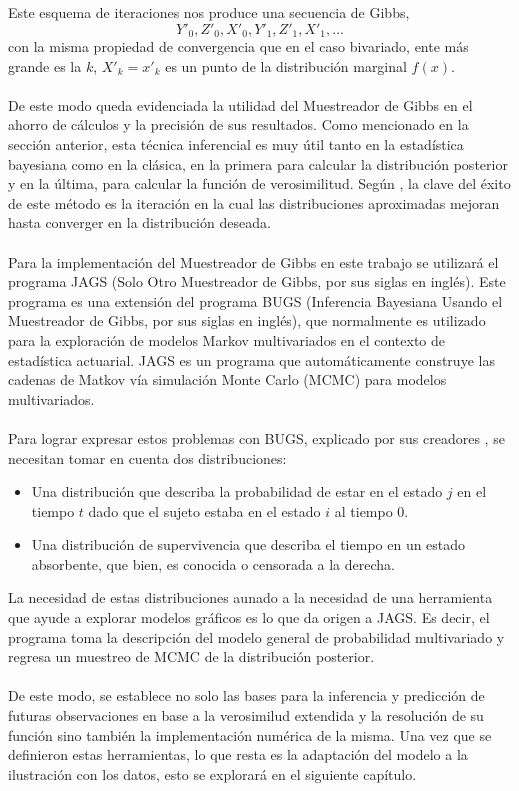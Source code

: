 Este esquema de iteraciones nos produce una secuencia de Gibbs,\\
\[Y'_0,Z'_0,X'_0,Y'_1,Z'_1,X'_1,...\]
con la misma propiedad de convergencia que en el caso bivariado, ente m\'as grande es la $k$, $X'_k=x'_k$ es un punto de la distribuci\'on marginal $f(x)$.\\
\\
De este modo queda evidenciada la utilidad del Muestreador de Gibbs en el ahorro de c\'alculos y la precisi\'on de sus resultados. Como mencionado en la secci\'on anterior, esta t\'ecnica inferencial es muy \'util tanto en la estad\'istica bayesiana como en la cl\'asica, en la primera para calcular la distribuci\'on posterior y en la \'ultima, para calcular la funci\'on de verosimilitud. Seg\'un \cite{gelman2014bayesian}, la clave del \'exito de este m\'etodo es la iteraci\'on en la cual las distribuciones aproximadas mejoran hasta converger en la distribuci\'on deseada.\\
\\
Para la implementaci\'on del Muestreador de Gibbs en este trabajo se utilizar\'a el programa JAGS (Solo Otro Muestreador de Gibbs, por sus siglas en ingl\'es). Este programa es una extensi\'on del programa BUGS (Inferencia Bayesiana Usando el Muestreador de Gibbs, por sus siglas en ingl\'es), que normalmente es utilizado para la exploraci\'on de modelos Markov multivariados en el contexto de estad\'istica actuarial. JAGS es un programa que autom\'aticamente construye las cadenas de Matkov v\'ia simulaci\'on Monte Carlo (MCMC) para modelos multivariados.\\
\\
Para lograr expresar estos problemas con BUGS, explicado por sus creadores \cite{plummer2003jags}, se necesitan tomar en cuenta dos distribuciones:
\begin{itemize}
\item Una distribuci\'on que describa la probabilidad de estar en el estado $j$ en el tiempo $t$ dado que el sujeto estaba en el estado $i$ al tiempo $0$.
\item Una distribuci\'on de supervivencia que describa el tiempo en un estado absorbente, que bien, es conocida o censorada a la derecha.
\end{itemize}
La necesidad de estas distribuciones aunado a la necesidad de una herramienta que ayude a explorar modelos gr\'aficos es lo que da origen a JAGS. Es decir, el programa toma la descripci\'on del modelo general de probabilidad multivariado y regresa un muestreo de MCMC de la distribuci\'on posterior.\\
\\
De este modo, se establece no solo las bases para la inferencia y predicci\'on de futuras observaciones en base a la verosimilud extendida y la resoluci\'on de su funci\'on sino tambi\'en la implementaci\'on num\'erica de la misma. Una vez que se definieron estas herramientas, lo que resta es la adaptaci\'on del modelo a la ilustraci\'on con los datos, esto se explorar\'a en el siguiente cap\'itulo.  